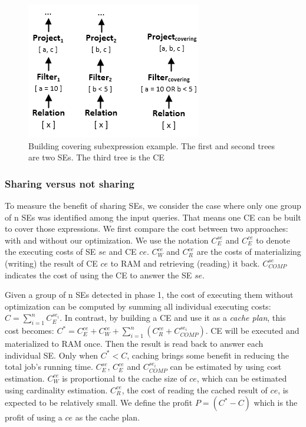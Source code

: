\begin{figure}[!htb]
	\centering
	\includegraphics[scale=0.75]{figures/covering}
	\caption{Building covering subexpression example. The first and second trees are two SEs. The third tree is the CE}
	\label{fig:covering}
\end{figure}

\subsubsection{Sharing versus not sharing}
\label{sec:sharing-vs-notsharing}
To measure the benefit of sharing SEs, we consider the case where only one group of n SEs was identified among the input queries. That means one CE can be built to cover those expressions. We first compare the cost between two approaches: with and without our optimization. We use the notation $C_{E}^{se}$ and $C_{E}^{ce}$ to denote the executing costs of SE $se$ and CE $ce$. $C_{W}^{ce}$ and $C_{R}^{ce}$ are the costs of materializing (writing) the result of CE $ce$ to RAM and retrieving (reading) it back. $C_{COMP}^{se}$ indicates the cost of using the CE to answer the SE $se$.

Given a group of n SEs detected in phase 1, the cost of executing them without optimization can be computed by summing all individual executing costs: $C = \sum _{i=1}^{n}C_{E}^{se_i}$. In contrast, by building a CE and use it as a \emph{cache plan}, this cost becomes: 
$C^* = C_{E}^{ce} + C_{W}^{ce} + \sum _{i=1}^{n}(C_{R}^{ce} + C_{COMP}^{se_i})$. 
CE will be executed and materialized to RAM once. Then the result is read back to answer each individual SE. Only when $C^* < C$, caching brings some benefit in reducing the total job's running time. $C_{E}^{se}$, $C_{E}^{ce}$ and $C_{COMP}^{se_i}$ can be estimated by using cost estimation. $C_{W}^{ce}$ is proportional to the cache size of $ce$, which can be estimated using cardinality estimation. $C_{R}^{ce}$, the cost of reading the cached result of $ce$, is expected to be relatively small. We define the profit $P = (C^*-C)$ which is the profit of using a $ce$ as the cache plan.

